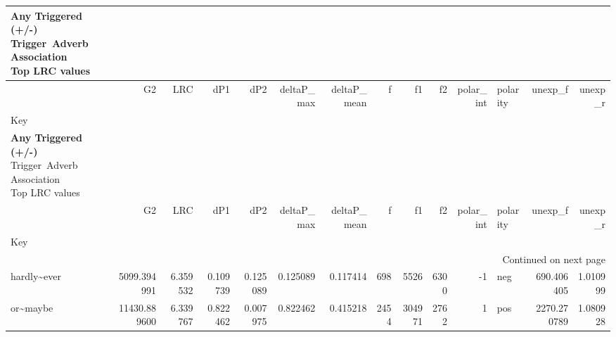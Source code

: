 
\begin{longtable}[ht]{lrrrrrrrrrrlrr}
\caption{\textbf{Any Triggered (+/-)}\\Trigger~Adverb Association\\Top LRC values} \label{trig-adv-AMtop-AnyTri} \\
\toprule
 & G2 & LRC & dP1 & dP2 & deltaP\_max & deltaP\_mean & f & f1 & f2 & polar\_int & polarity & unexp\_f & unexp\_r \\
Key &  &  &  &  &  &  &  &  &  &  &  &  &  \\
\midrule
\endfirsthead
\caption[]{\textbf{Any Triggered (+/-)}\\Trigger~Adverb Association\\Top LRC values} \\
\toprule
 & G2 & LRC & dP1 & dP2 & deltaP\_max & deltaP\_mean & f & f1 & f2 & polar\_int & polarity & unexp\_f & unexp\_r \\
Key &  &  &  &  &  &  &  &  &  &  &  &  &  \\
\midrule
\endhead
\midrule
\multicolumn{14}{r}{Continued on next page} \\
\midrule
\endfoot
\bottomrule
\endlastfoot
hardly\textasciitilde ever & {\cellcolor[HTML]{E9E4F1}} \color[HTML]{000000} 5099.394991 & {\cellcolor[HTML]{67001F}} \color[HTML]{F1F1F1} 6.359532 & {\cellcolor[HTML]{E7E1EF}} \color[HTML]{000000} 0.109739 & {\cellcolor[HTML]{C995C7}} \color[HTML]{F1F1F1} 0.125089 & {\cellcolor[HTML]{E8E2F0}} \color[HTML]{000000} 0.125089 & {\cellcolor[HTML]{D8C1DE}} \color[HTML]{000000} 0.117414 & {\cellcolor[HTML]{F6F3F8}} \color[HTML]{000000} 698 & {\cellcolor[HTML]{F7F4F9}} \color[HTML]{000000} 5526 & {\cellcolor[HTML]{EFEAF4}} \color[HTML]{000000} 6300 & {\cellcolor[HTML]{F7F4F9}} \color[HTML]{000000} -1 & neg & {\cellcolor[HTML]{F3F0F7}} \color[HTML]{000000} 690.406405 & {\cellcolor[HTML]{F7F4F9}} \color[HTML]{000000} 1.010999 \\
or\textasciitilde maybe & {\cellcolor[HTML]{D4B8D9}} \color[HTML]{000000} 11430.889600 & {\cellcolor[HTML]{6A0021}} \color[HTML]{F1F1F1} 6.339767 & {\cellcolor[HTML]{67001F}} \color[HTML]{F1F1F1} 0.822462 & {\cellcolor[HTML]{F7F4F9}} \color[HTML]{000000} 0.007975 & {\cellcolor[HTML]{67001F}} \color[HTML]{F1F1F1} 0.822462 & {\cellcolor[HTML]{67001F}} \color[HTML]{F1F1F1} 0.415218 & {\cellcolor[HTML]{F2EEF6}} \color[HTML]{000000} 2454 & {\cellcolor[HTML]{E9E4F1}} \color[HTML]{000000} 304971 & {\cellcolor[HTML]{F7F4F9}} \color[HTML]{000000} 2762 & {\cellcolor[HTML]{67001F}} \color[HTML]{F1F1F1} 1 & pos & {\cellcolor[HTML]{E9E3F0}} \color[HTML]{000000} 2270.270789 & {\cellcolor[HTML]{F2EFF6}} \color[HTML]{000000} 1.080928 \\

\end{longtable}
